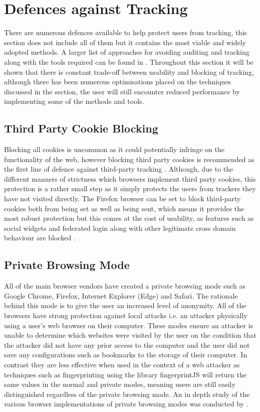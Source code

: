 \documentclass[12pt]{article}
\begin{document}
\pagebreak

\section{Defences against Tracking}
There are numerous defences available to help protect users from tracking, this section does not include all of them but it contains the most viable and widely adopted methods. A larger list of approaches for avoiding  auditing and tracking along with the tools required can be found in \parencite{bujlow2015web}. Throughout this section it will be shown that there is constant trade-off between usability and blocking of tracking, although there has been numerous optimisations placed on the techniques discussed in the section, the user will still encounter reduced performance by implementing some of the methods and tools.   

\subsection{Third Party Cookie Blocking}
Blocking all cookies is uncommon as it could potentially infringe on the functionality of the web, however blocking third party cookies is recommended as the first line of defence against third-party tracking \parencite{roesner}. Although, due to the different manners of strictness which browsers implement third party cookies, this protection is a rather small step as it simply protects the users from trackers they have not visited directly. The Firefox browser can be set to block third-party cookies both from being set as well as being sent, which means it provides the most robust protection but this comes at the cost of usability, as features such as social widgets and federated login along with other legitimate cross domain behaviour are blocked \parencite{roesner}.

\subsection{Private Browsing Mode}
All of the main browser vendors have created a private browsing mode such as Google Chrome, Firefox, Internet Explorer (Edge) and Safari. The rationale behind this mode is to give the user an increased level of anonymity. All of the browsers have strong protection against local attacks i.e. an attacker physically using a user's web browser on their computer. These modes ensure an attacker is unable to determine which websites were visited by the user on the condition that the attacker did not have any prior access to the computer and the user did not save any configurations such as bookmarks to the storage of their computer. In contrast they are less effective when used in the context of a web attacker as techniques such as fingerprinting using the library fingerprintJS will return the same values in the normal and private modes, meaning users are still easily distinguished regardless of the private browsing mode. An in depth study of the various browser implementations of private browsing modes was conducted by \parencite{bursztein2010analysis}.    
\end{document}
